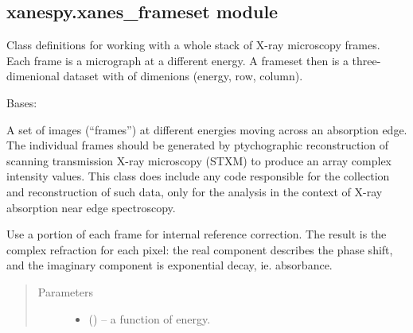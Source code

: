 \documentclass[letterpaper,10pt,english]{sphinxmanual}
\begin{document}
\subsection{xanespy.xanes\_frameset module}
\label{\detokenize{xanespy:module-xanespy.xanes_frameset}}\label{\detokenize{xanespy:xanespy-xanes-frameset-module}}
Class definitions for working with a whole stack of X-ray
microscopy frames. Each frame is a micrograph at a different energy. A
frameset then is a three-dimenional dataset with of dimenions (energy,
row, column).

\begin{fulllineitems}
\label{\detokenize{xanespy:xanespy.xanes_frameset.PtychoFrameset}}
Bases: {\hyperref[\detokenize{xanespy:xanespy.xanes_frameset.XanesFrameset}]{}}

A set of images (``frames'') at different energies moving across an
absorption edge. The individual frames should be generated by
ptychographic reconstruction of scanning transmission X-ray
microscopy (STXM) to produce an array complex intensity
values. This class does  include any code responsible for the
collection and reconstruction of such data, only for the analysis
in the context of X-ray absorption near edge spectroscopy.

\begin{fulllineitems}
\label{\detokenize{xanespy:xanespy.xanes_frameset.PtychoFrameset.apply_internal_reference}}
Use a portion of each frame for internal reference correction. The
result is the complex refraction for each pixel: the real
component describes the phase shift, and the imaginary
component is exponential decay, ie. absorbance.
\begin{quote}\begin{description}
\item[{Parameters}] \leavevmode\begin{itemize}
\item {} 
 (\sphinxstyleliteralemphasis{, }) -- a function of energy.


\end{itemize}
\end{description}
\end{quote}
\end{fulllineitems}
\end{fulllineitems}
\end{document}
